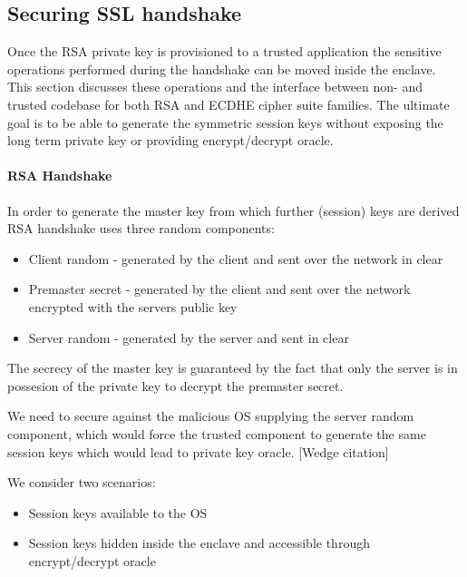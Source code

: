 \documentclass[../main.tex]{subfiles}
\begin{document}
\setlength\parindent{0pt}

\subsection{Securing SSL handshake}
Once the RSA private key is provisioned to a trusted application the sensitive
operations performed during the handshake can be moved inside the enclave.
This section discusses these operations and the interface between non- and
trusted codebase for both RSA and ECDHE cipher suite families.
The ultimate goal is to be able to generate the symmetric session keys without
exposing the long term private key or providing encrypt/decrypt oracle.

\paragraph{RSA Handshake}
In order to generate the master key from which further (session) keys
are derived RSA handshake uses three random components:
\begin{itemize}
	\item Client random - generated by the client and sent over the network in
	clear
	\item Premaster secret - generated by the client and sent over the network
	encrypted with the servers public key
	\item Server random - generated by the server and sent in clear
\end{itemize}


The secrecy of the master key is guaranteed by the fact that only the server is in possesion of the private key to decrypt the premaster secret.

We need to secure against the malicious OS supplying the server random component, which would force the trusted component to generate the same session keys which would lead to private key oracle. [Wedge citation]


We consider two scenarios:
\begin{itemize}
	\item Session keys available to the OS
	\item Session keys hidden inside the enclave and accessible through encrypt/decrypt oracle
\end{itemize}
\end{document}
